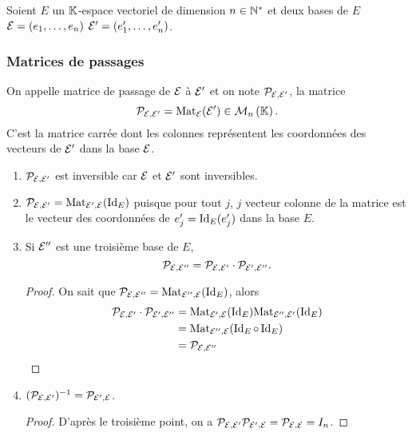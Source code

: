 Soient \(E\) un \(\K\)-espace vectoriel de dimension \(n \in \N^*\) et deux 
bases de \(E\) \(\E=(e_1, \ldots, e_n)\) \(\E'=(e'_1, \ldots, e'_n)\). 

\subsubsection{Matrices de passages}

\begin{defdef} On appelle matrice de passage de \(\E\) à \(\E'\) et on note 
  \(\P_{\E,\E'}\), la matrice
  \begin{equation}
    \P_{\E,\E'} = \Mat_\E(\E') \in \Mn{n}{\K}.
  \end{equation}
  C'est la matrice carrée dont les colonnes représentent les coordonnées des 
  vecteurs de \(\E'\) dans la base \(\E\).
\end{defdef}

\begin{prop}
  \begin{enumerate}
    \item \(\P_{\E,\E'}\) est inversible car \(\E\) et \(\E'\) sont 
      inversibles.
    \item \(\P_{\E,\E'} = \Mat_{\E',\E}(\Id_E)\) puisque pour tout \(j\), 
      \(j\)\ieme{} vecteur colonne de la matrice est le vecteur des 
      coordonnées de \(e'_j=\Id_E(e'_j)\) dans la base \(E\).
    \item Si \(\E''\) est une troisième base de \(E\),
      \begin{equation}
        \P_{\E,\E''}=\P_{\E,\E'} \cdot \P_{\E',\E''}.
      \end{equation}
      \begin{proof}
        On sait que \(\P_{\E,\E''} = \Mat_{\E'',\E}(\Id_E)\), alors
        \begin{align}
          \P_{\E,\E'} \cdot \P_{\E',\E''} &= \Mat_{\E',\E}(\Id_E) 
          \Mat_{\E'',\E'}(\Id_E) \\
          &= \Mat_{\E'',\E}(\Id_E \circ \Id_E) \\
          &=\P_{\E,\E''}
        \end{align}
      \end{proof}
    \item \((\P_{\E,\E'})^{-1} = \P_{\E',\E}\).
      \begin{proof}
        D'après le troisième point, on a \(\P_{\E,\E'} 
        \P_{\E',\E}=\P_{\E,\E}=I_n\).
      \end{proof}
  \end{enumerate}
\end{prop}

